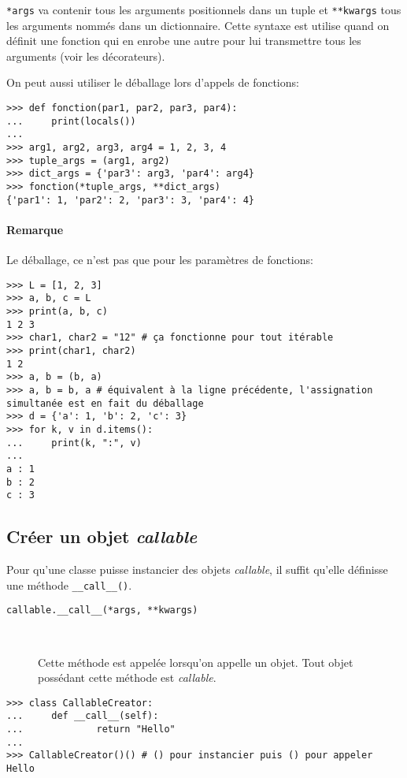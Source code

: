 \texttt{*args} va contenir tous les arguments positionnels dans un tuple et \texttt{**kwargs}
tous les arguments nommés dans un dictionnaire. Cette syntaxe est utilise quand on définit une fonction qui en enrobe une
autre pour lui transmettre tous les arguments (voir les décorateurs).\bigskip

On peut aussi utiliser le déballage lors d'appels de fonctions:
\begin{verbatim}
>>> def fonction(par1, par2, par3, par4):
...     print(locals())
...
>>> arg1, arg2, arg3, arg4 = 1, 2, 3, 4
>>> tuple_args = (arg1, arg2)
>>> dict_args = {'par3': arg3, 'par4': arg4}
>>> fonction(*tuple_args, **dict_args)
{'par1': 1, 'par2': 2, 'par3': 3, 'par4': 4}
\end{verbatim}

\paragraph*{Remarque} Le déballage, ce n'est pas que pour les paramètres de fonctions:
\begin{verbatim}
>>> L = [1, 2, 3]
>>> a, b, c = L
>>> print(a, b, c)
1 2 3
>>> char1, char2 = "12" # ça fonctionne pour tout itérable
>>> print(char1, char2)
1 2
>>> a, b = (b, a)
>>> a, b = b, a # équivalent à la ligne précédente, l'assignation simultanée est en fait du déballage
>>> d = {'a': 1, 'b': 2, 'c': 3}
>>> for k, v in d.items():
...     print(k, ":", v)
... 
a : 1
b : 2
c : 3
\end{verbatim}

\subsection{Créer un objet {\normalfont\bfseries\itshape callable}}

Pour qu'une classe puisse instancier des objets \emph{callable}, il suffit qu'elle définisse une méthode
\texttt{__call__()}.

\begin{description}
    \item[\texttt{callable.__call__(*args, **kwargs)}]~
 
    Cette méthode est appelée lorsqu'on appelle un objet. Tout objet possédant cette méthode est \emph{callable}.
\end{description}

\begin{verbatim}
>>> class CallableCreator:
...     def __call__(self):
...             return "Hello"
...
>>> CallableCreator()() # () pour instancier puis () pour appeler
Hello
\end{verbatim}


